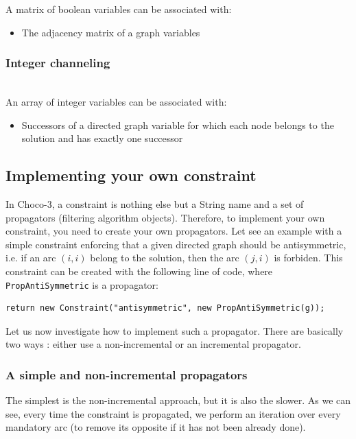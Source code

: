 \documentclass{article}
\begin{document}
A matrix of boolean variables can be associated with: 
\begin{itemize}
\item The adjacency matrix of a graph variables
\end{itemize}

\subsubsection{Integer channeling}~\\

An array of integer variables can be associated with: 
\begin{itemize}
\item Successors of a directed graph variable for which each node belongs to the solution and has exactly one successor
\end{itemize}


\subsection{Implementing your own constraint}

In Choco-3, a constraint is nothing else but a String name and a set of propagators (filtering algorithm objects). Therefore, 
to implement your own constraint, you need to create your own propagators. Let see an example with a simple constraint enforcing that a given directed graph should be antisymmetric, i.e. if an arc $(i,i)$ belong to the solution, then the arc $(j,i)$ is forbiden. This constraint can be created with the following line of code, where \texttt{PropAntiSymmetric} is a propagator:
\begin{lstlisting}
return new Constraint("antisymmetric", new PropAntiSymmetric(g));
\end{lstlisting}

Let us now investigate how to implement such a propagator. There are basically two ways : either use a non-incremental or an incremental propagator. 

\subsubsection{A simple and non-incremental propagators}

The simplest is the non-incremental approach, but it is also the slower. As we can see, every time the constraint is propagated, we perform an iteration over every mandatory arc (to remove its opposite if it has not been already done). 
\end{document}

